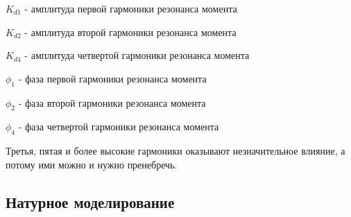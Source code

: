 $K_{d1}$ - амплитуда первой гармоники резонанса момента

$K_{d2}$ - амплитуда второй гармоники резонанса момента

$K_{d4}$ - амплитуда четвертой гармоники резонанса момента

$\phi_{1}$ - фаза первой гармоники резонанса момента

$\phi_{2}$ - фаза второй гармоники резонанса момента

$\phi_{4}$ - фаза четвертой гармоники резонанса момента

Третья, пятая и более высокие гармоники оказывают незначительное влияние, а потому
ими можно и нужно пренебречь.

\newpage
\subsection{Натурное моделирование}

\endinput

